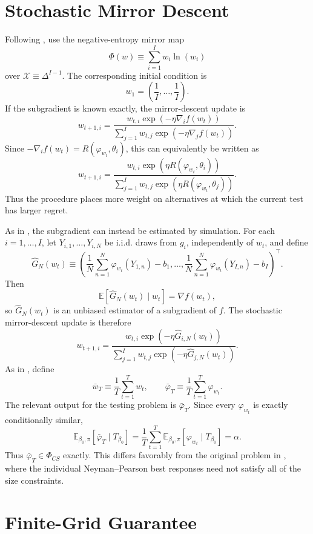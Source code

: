 \documentclass{article}
\theoremstyle{definition}
\theoremstyle{plain}
\theoremstyle{remark}
\begin{document}
\section{Stochastic Mirror Descent}

Following \cite{aradillas2025approximate}, use the negative-entropy mirror map
\[\Phi(w)\equiv\sum_{i=1}^Iw_i\ln(w_i)\]
over \(\mathcal{X}\equiv\Delta^{I-1}\). The corresponding initial condition is
\[w_1=\left(\frac{1}{I},\ldots,\frac{1}{I}\right).\]
If the subgradient is known exactly, the mirror-descent update is
\[w_{t+1,i}=\frac{w_{t,i}\exp\left(-\eta\nabla_i f(w_t)\right)}{\sum_{j=1}^Iw_{t,j}\exp\left(-\eta\nabla_j f(w_t)\right)}.\]
Since \(-\nabla_i f(w_t)=R(\varphi_{w_t},\theta_i)\), this can equivalently be written as
\[w_{t+1,i}=\frac{w_{t,i}\exp\left(\eta R(\varphi_{w_t},\theta_i)\right)}{\sum_{j=1}^Iw_{t,j}\exp\left(\eta R(\varphi_{w_t},\theta_j)\right)}.\]
Thus the procedure places more weight on alternatives at which the current test has larger regret.

As in \cite{aradillas2025approximate}, the subgradient can instead be estimated by simulation. For each \(i=1,\ldots,I\), let \(Y_{i,1},\ldots,Y_{i,N}\) be i.i.d. draws from \(g_i\), independently of \(w_t\), and define
\[\widehat{G}_N(w_t)\equiv\left(\frac{1}{N}\sum_{n=1}^N\varphi_{w_t}(Y_{1,n})-b_1,\ldots,\frac{1}{N}\sum_{n=1}^N\varphi_{w_t}(Y_{I,n})-b_I\right)^\top.\]
Then
\[\mathbb{E}\left[\widehat{G}_N(w_t)\mid w_t\right]=\nabla f(w_t),\]
so \(\widehat{G}_N(w_t)\) is an unbiased estimator of a subgradient of \(f\). The stochastic mirror-descent update is therefore
\[w_{t+1,i}=\frac{w_{t,i}\exp\left(-\eta\widehat{G}_{i,N}(w_t)\right)}{\sum_{j=1}^Iw_{t,j}\exp\left(-\eta\widehat{G}_{j,N}(w_t)\right)}.\]
As in \cite{aradillas2025approximate}, define
\[\bar{w}_T\equiv\frac{1}{T}\sum_{t=1}^T w_t,\qquad \bar{\varphi}_T\equiv\frac{1}{T}\sum_{t=1}^T\varphi_{w_t}.\]
The relevant output for the testing problem is \(\bar{\varphi}_T\). Since every \(\varphi_{w_t}\) is exactly conditionally similar,
\[\mathbb{E}_{\beta_0,\pi}[\bar{\varphi}_T\mid T_{\beta_0}]=\frac{1}{T}\sum_{t=1}^T\mathbb{E}_{\beta_0,\pi}[\varphi_{w_t}\mid T_{\beta_0}]=\alpha.\]
Thus \(\bar{\varphi}_T\in\Phi_{CS}\) exactly. This differs favorably from the original problem in \cite{aradillas2025approximate}, where the individual Neyman--Pearson best responses need not satisfy all of the size constraints.

\section{Finite-Grid Guarantee}
\end{document}

